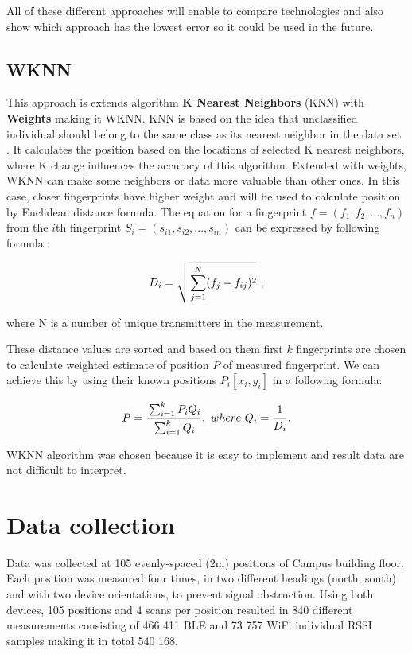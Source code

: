 All of these different approaches will enable to compare technologies and also show which approach has the lowest error so it could be used in the future. 

\subsection{WKNN}\label{sec:WKNN}
This approach is extends algorithm \textbf{K Nearest Neighbors} (KNN) with \textbf{Weights} making it WKNN. KNN is based on the idea that unclassified individual should belong to the same class as its nearest neighbor in the data set \cite{HGAfC}. It calculates the position based on the locations of selected K nearest neighbors, where K change influences the accuracy of this algorithm. Extended with weights, WKNN can make some neighbors or data more valuable than other ones. In this case, closer fingerprints have higher weight and will be used to calculate position by Euclidean distance formula. The equation for a fingerprint $f = (f_1,f_2,...,f_n)$ from the $i$th fingerprint $S_i = (s_{i1} ,s_{i2},...,s_{in})$ can be expressed by following formula \cite{IILUBLEB, HGAfC}:

$$D_i = \sqrt{\strut\sum_{j=1}^{N}(f_j-f_{ij})^2}\ ,$$

where N is a number of unique transmitters in the measurement.

These distance values are sorted and based on them first $k$ fingerprints are chosen to calculate weighted estimate of position $P$ of measured fingerprint. We can achieve this by using their known positions $P_i[x_i,y_i]$ in a following formula:

$$ P = 
\frac
	{\strut\sum_{i=1}^{k} P_i Q_i}
	{\strut\sum_{i=1}^{k} Q_i},\
where\
	Q_i = \frac{\strut 1}{\strut D_i}.$$

WKNN algorithm was chosen because it is easy to implement and result data are not difficult to interpret.

\section{Data collection}\label{sec:DataCollection}
Data was collected at 105 evenly-spaced (2m) positions of Campus building floor. Each position was measured four times, in two different headings (north, south) and with two device orientations, to prevent signal obstruction. Using both devices, 105 positions and 4 scans per position resulted in 840 different measurements consisting of 466 411 BLE and 73 757 WiFi individual RSSI samples making it in total 540 168.

